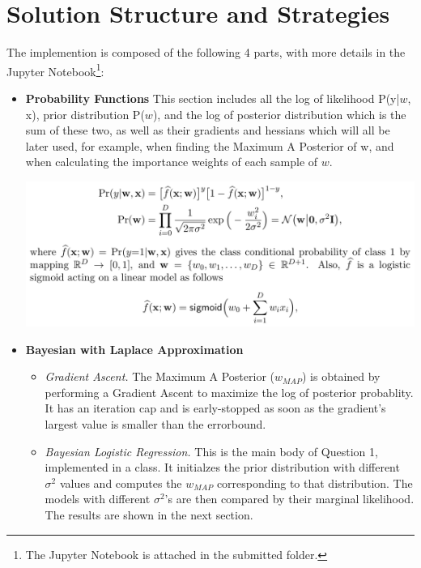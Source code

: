 \documentclass{article} %
\begin{document}
\vspace{0.3cm}
\section*{Solution Structure and Strategies} %
The implemention is composed of the following 4 parts, with more details in the Jupyter Notebook\footnote{The Jupyter Notebook is attached in the submitted folder.}:
\begin{itemize}
  \item \textbf{Probability Functions}
    This section includes all the log of likelihood P(y|$w$, x), prior distribution P($w$), and the log of posterior distribution which is the sum of these two, as well as their gradients and hessians which will all be later used, for example, when finding the Maximum A Posterior of w, and when calculating the importance weights of each sample of $w$.
    \begin{minipage}{\linewidth}
      \raggedright
      \includegraphics[width=\textwidth]{Equations.png}
    \end{minipage}

  \item \textbf{Bayesian with Laplace Approximation}
  \begin{itemize}
    \item \textit{Gradient Ascent.} The Maximum A Posterior ($w_{MAP}$) is obtained by performing a Gradient Ascent to maximize the log of posterior probablity. It has an iteration cap and is early-stopped as soon as the gradient's largest value is smaller than the errorbound.

    \item \textit{Bayesian Logistic Regression.} This is the main body of Question 1, implemented in a class. It initialzes the prior distribution with different $\sigma^2$ values and computes the $w_{MAP}$ corresponding to that distribution. The models with different $\sigma^2$'s are then compared by their marginal likelihood. The results are shown in the next section.
  \end{itemize}


\end{itemize}
\end{document}
